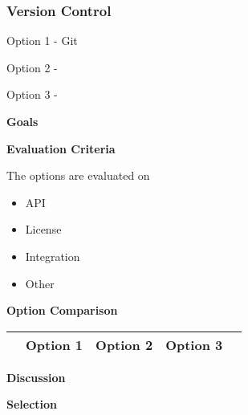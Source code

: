 \documentclass[letterpaper, 10pt, draftclsnofoot, compsoc, onecolumn]{IEEEtran}
\begin{document}
{%

\medskip

\newpage
\subsubsection{Version Control}
{\noindent Option 1 - Git \par}
{\noindent \par}

\medskip
{\noindent Option 2 -  \par}
{\noindent \par}

\medskip
{\noindent Option 3 - \par}
{\noindent \par}

\medskip
{\noindent\rmfamily\bfseries\color{black} Goals \par}
{\noindent \par}

\medskip
\newpage
{\noindent\rmfamily\bfseries\color{black} Evaluation Criteria \par}
{\noindent The options are evaluated on 

\begin{itemize}
\item API
\item License
\item Integration
\item Other
\end{itemize}

 \par}


\newpage
{\noindent\rmfamily\bfseries\color{black} Option Comparison \par}
\tablehead{}
\begin{supertabular}{|p{2cm}|p{2.5cm}|p{2.5cm}|p{2.5cm}|p{2.5cm}|}
\hline & Option 1 & Option 2 & Option 3\\ \hline
\end{supertabular}

\newpage
{\noindent\rmfamily\bfseries\color{black} Discussion \par}
{\noindent  \par}

\medskip
{\noindent\rmfamily\bfseries\color{black} Selection \par}
{\noindent \par}

}
\end{document}
